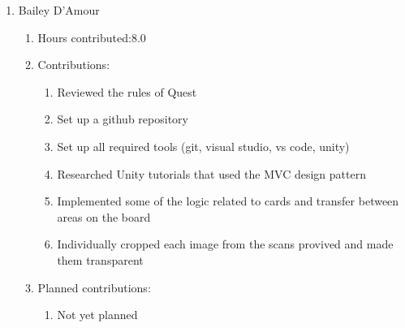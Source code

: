 \documentclass[11pt]{article}
\begin{document}
\begin{enumerate}
\item Bailey D'Amour
\begin{enumerate}
\item Hours contributed:8.0
\item Contributions:
\begin{enumerate}
\item Reviewed the rules of Quest
\item Set up a github repository
\item Set up all required tools (git, visual studio, vs code, unity)
\item Researched Unity tutorials that used the MVC design pattern
\item Implemented some of the logic related to cards and transfer between areas on the board
\item Individually cropped each image from the scans provived and made them transparent
\end{enumerate}
\item Planned contributions:
\begin{enumerate}
\item Not yet planned
\end{enumerate}
\end{enumerate}
\end{enumerate}
\end{document}
